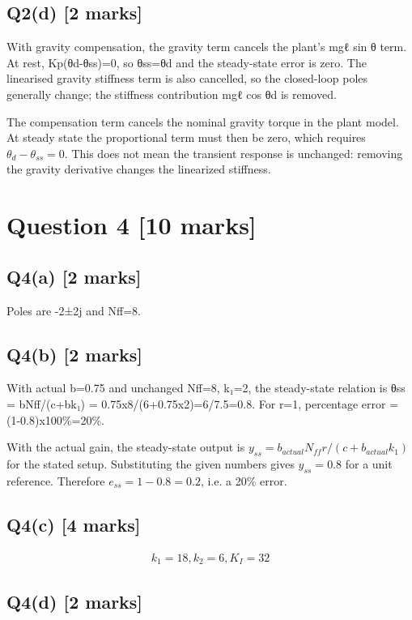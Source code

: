 \documentclass[11pt,a4paper]{article}
\begin{document}
\subsection*{Q2(d) \hfill [2 marks]}

With gravity compensation, the gravity term cancels the plant's mgℓ sin θ term.
At rest, Kp(θd-θss)=0, so θss=θd and the steady-state error is zero.
The linearised gravity stiffness term is also cancelled, so the closed-loop poles generally change; the stiffness contribution mgℓ cos θd is removed.\par\smallskip The compensation term cancels the nominal gravity torque in the plant model. At steady state the proportional term must then be zero, which requires $\theta_d-\theta_{ss}=0$. This does not mean the transient response is unchanged: removing the gravity derivative changes the linearized stiffness.

\section*{Question 4 \hfill [10 marks]}
\subsection*{Q4(a) \hfill [2 marks]}

Poles are -2±2j and Nff=8.

\subsection*{Q4(b) \hfill [2 marks]}

With actual b=0.75 and unchanged Nff=8, k₁=2, the steady-state relation is θss = bNff/(c+bk₁) = 0.75x8/(6+0.75x2)=6/7.5=0.8.
For r=1, percentage error = (1-0.8)x100\%=20\%.\par\smallskip With the actual gain, the steady-state output is $y_{ss}=b_{actual}N_{ff}r/ (c+b_{actual}k_1)$ for the stated setup. Substituting the given numbers gives $y_{ss}=0.8$ for a unit reference. Therefore $e_{ss}=1-0.8=0.2$, i.e. a 20\% error.

\subsection*{Q4(c) \hfill [4 marks]}

\[\begin{aligned}k_1=18, k_2=6, K_I=32\end{aligned}\]

\subsection*{Q4(d) \hfill [2 marks]}

\vspace{2mm}
\end{document}
